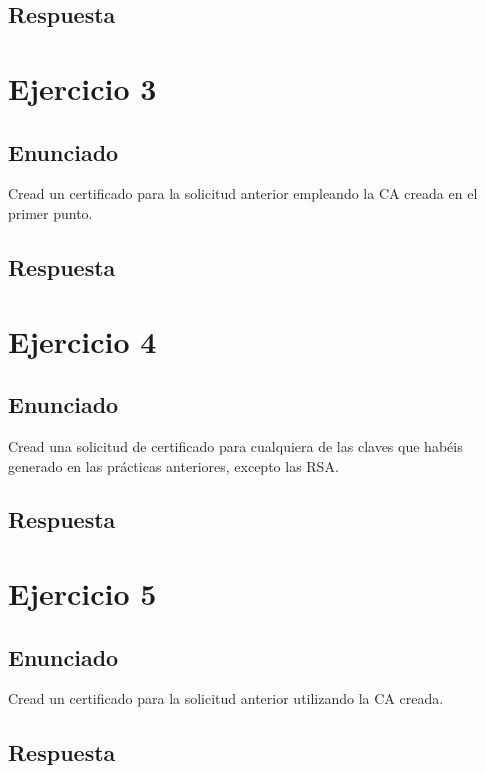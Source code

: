 \documentclass[10pt,a4paper,spanish]{report}
\begin{document}
\section{Respuesta}
\noindent

\chapter{Ejercicio 3}

\section{Enunciado}
\noindent
Cread un certificado para la solicitud anterior empleando la CA creada en el primer punto.

\section{Respuesta}
\noindent

\chapter{Ejercicio 4}

\section{Enunciado}
\noindent
Cread una solicitud de certificado para cualquiera de las claves que habéis generado en las prácticas anteriores, excepto las RSA.

\section{Respuesta}
\noindent

\chapter{Ejercicio 5}

\section{Enunciado}
\noindent
Cread un certificado para la solicitud anterior utilizando la CA creada.

\section{Respuesta}
\noindent
\end{document}
